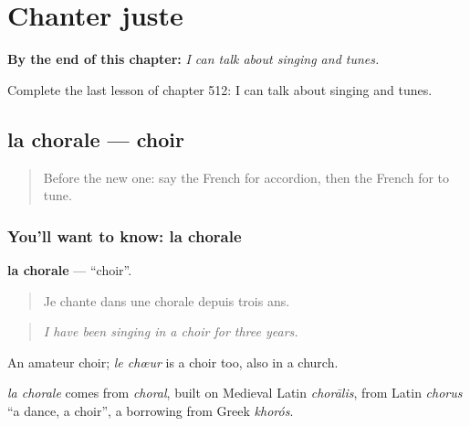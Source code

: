 
\chapter{Chanter juste}
\label{ch:fr-chanter-juste}

\begin{chapteropening}
\textbf{By the end of this chapter:} \emph{I can talk about singing and tunes.}

Complete the last lesson of chapter 512: I can talk about singing and tunes.
\end{chapteropening}

\section[la chorale]{la chorale — choir}

\label{lesson:FR-C512-chorale}



\begin{quote}
Before the new one: say the French for accordion, then the French for to tune.
\end{quote}

\subsection*{You'll want to know: la chorale}
\textbf{la chorale} — \textquotedblleft{}choir\textquotedblright{}.

\begin{quote}
Je chante dans une chorale depuis trois ans.
\end{quote}

\begin{quote}
\emph{I have been singing in a choir for three years.}
\end{quote}

An amateur choir; \emph{le chœur} is a choir too, also in a church.

\begin{cousinweb}
\emph{la chorale} comes from \emph{choral}, built on Medieval Latin \emph{chorālis}, from Latin \emph{chorus} \textquotedblleft{}a dance, a choir\textquotedblright{}, a borrowing from Greek \emph{khorós}.
\end{cousinweb}

